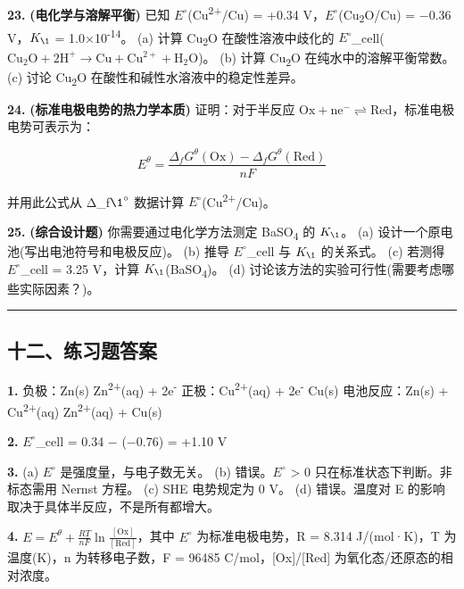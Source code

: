 \textbf{23.} \textbf{(电化学与溶解平衡)} 已知 \(E^{\circ}\)(Cu\textsuperscript{2+}/Cu) = +0.34 V，\(E^{\circ}\)(Cu\textsubscript{2}O/Cu) = −0.36 V，\(K_{\1}\) = 1.0×10\textsuperscript{-14}。
(a) 计算 Cu\textsubscript{2}O 在酸性溶液中歧化的 \(E^{\circ}\)\_cell(\(\mathrm{Cu_2O + 2H^+ \to Cu + Cu^{2+} + H_2O}\))。
(b) 计算 Cu\textsubscript{2}O 在纯水中的溶解平衡常数。
(c) 讨论 Cu\textsubscript{2}O 在酸性和碱性水溶液中的稳定性差异。

\textbf{24.} \textbf{(标准电极电势的热力学本质)} 证明：对于半反应 \(\mathrm{Ox + ne^- \rightleftharpoons Red}\)，标准电极电势可表示为：

\[E^\theta = \frac{\Delta_f G^\theta(\mathrm{Ox}) - \Delta_f G^\theta(\mathrm{Red})}{nF}\]

并用此公式从 Δ\_f\(\1^{\circ}\) 数据计算 \(E^{\circ}\)(Cu\textsuperscript{2+}/Cu)。

\textbf{25.} \textbf{(综合设计题)} 你需要通过电化学方法测定 BaSO\textsubscript{4} 的 \(K_{\1}\)。
(a) 设计一个原电池(写出电池符号和电极反应)。
(b) 推导 \(E^{\circ}\)\_cell 与 \(K_{\1}\) 的关系式。
(c) 若测得 \(E^{\circ}\)\_cell = 3.25 V，计算 \(K_{\1}\)(BaSO\textsubscript{4})。
(d) 讨论该方法的实验可行性(需要考虑哪些实际因素？)。

\begin{center}\rule{0.5\linewidth}{0.5pt}\end{center}

\subsection{十二、练习题答案}\label{ux5341ux4e8cux7ec3ux4e60ux9898ux7b54ux6848}

\textbf{1.}
负极：Zn(s) \箭 Zn\textsuperscript{2+}(aq) + 2e\textsuperscript{-}
正极：Cu\textsuperscript{2+}(aq) + 2e\textsuperscript{-} \箭 Cu(s)
电池反应：Zn(s) + Cu\textsuperscript{2+}(aq) \箭 Zn\textsuperscript{2+}(aq) + Cu(s)

\textbf{2.} \(E^{\circ}\)\_cell = 0.34 − (−0.76) = +1.10 V

\textbf{3.}
(a) \(E^{\circ}\) 是强度量，与电子数无关。
(b) 错误。\(E^{\circ}\) \textgreater{} 0 只在标准状态下判断。非标态需用 Nernst 方程。
(c) SHE 电势规定为 0 V。
(d) 错误。温度对 E 的影响取决于具体半反应，不是所有都增大。

\textbf{4.} \(E = E^\theta + \frac{RT}{nF}\ln\frac{[\mathrm{Ox}]}{[\mathrm{Red}]}\)，其中 \(E^{\circ}\) 为标准电极电势，R = 8.314 J/(mol·K)，T 为温度(K)，n 为转移电子数，F = 96485 C/mol，{[}Ox{]}/{[}Red{]} 为氧化态/还原态的相对浓度。

